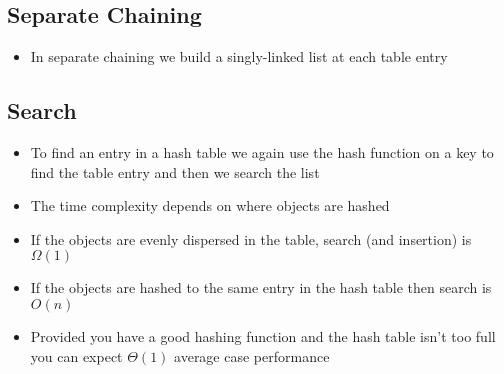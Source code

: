 
\begin{slide}
\section{Separate Chaining}

\pausebuild
\color{TextColor}
\begin{itemize}
\item In separate chaining we build a singly-linked list at each table
  entry\pauseh
\end{itemize}
\begin{center}
  \pause
\end{center}
\end{slide}


\begin{slide}
\section[-1]{Search}

\begin{PauseHighLight}
  \begin{itemize}
  \item To find an entry in a hash table we again use the hash function
    on a key to find the table entry and then we search the list\pause
  \item The time complexity depends on where objects are hashed\pause
  \item If the objects are evenly dispersed in the table, search (and
    insertion) is $\Omega(1)$\pause
  \item If the objects are hashed to the same entry in the hash table
    then search is $O(n)$\pause
  \item Provided you have a good hashing function and the hash table
    isn't too full you can expect $\Theta(1)$ average case performance\pause
  \end{itemize}
\end{PauseHighLight}

\end{slide}


